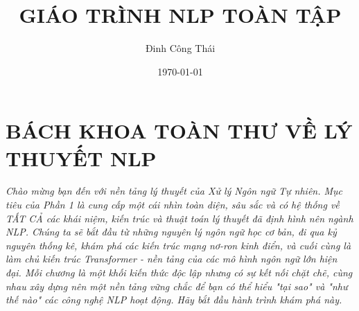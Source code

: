 \documentclass[11pt, a4paper, twoside]{book}
\title{GIÁO TRÌNH NLP TOÀN TẬP \\ \large}
\author{Đinh Công Thái}
\date{\today}
\begin{document}
\maketitle
\tableofcontents

\mainmatter


\part{BÁCH KHOA TOÀN THƯ VỀ LÝ THUYẾT NLP}

\textit{Chào mừng bạn đến với nền tảng lý thuyết của Xử lý Ngôn ngữ Tự nhiên. Mục tiêu của Phần 1 là cung cấp một cái nhìn toàn diện, sâu sắc và có hệ thống về TẤT CẢ các khái niệm, kiến trúc và thuật toán lý thuyết đã định hình nên ngành NLP. Chúng ta sẽ bắt đầu từ những nguyên lý ngôn ngữ học cơ bản, đi qua kỷ nguyên thống kê, khám phá các kiến trúc mạng nơ-ron kinh điển, và cuối cùng là làm chủ kiến trúc Transformer - nền tảng của các mô hình ngôn ngữ lớn hiện đại. Mỗi chương là một khối kiến thức độc lập nhưng có sự kết nối chặt chẽ, cùng nhau xây dựng nên một nền tảng vững chắc để bạn có thể hiểu "tại sao" và "như thế nào" các công nghệ NLP hoạt động. Hãy bắt đầu hành trình khám phá này.}

% 
% 
% 
% 
% 
% 

% 
% 
% 
% 
% 

% 
% 
% 
% 
% 
% 
% 
% 
% 

% 
% 
% 
% 
% 
% 

% 
% 
% 
% 
% 
% 
\end{document}
